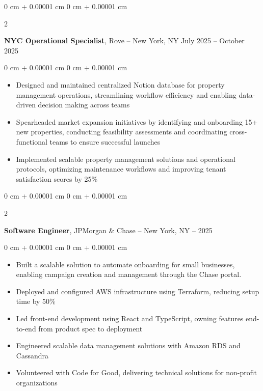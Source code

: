 \documentclass[10pt, letterpaper]{article}
\newenvironment{highlights}{
    \begin{itemize}[
        topsep=0.10 cm,
        parsep=0.10 cm,
        partopsep=0pt,
        itemsep=0pt,
        leftmargin=0 cm + 10pt
    ]
}{
    \end{itemize}
} %
\newenvironment{onecolentry}{
    \begin{adjustwidth}{
        0 cm + 0.00001 cm
    }{
        0 cm + 0.00001 cm
    }
}{
    \end{adjustwidth}
} %
\newenvironment{twocolentry}[2][]{
    \onecolentry
    \def\secondColumn{#2}
    \setcolumnwidth{\fill, 4.5 cm}
    \begin{paracol}{2}
}{
    \switchcolumn \raggedleft \secondColumn
    \end{paracol}
    \endonecolentry
} %
\begin{document}
    \vspace{0.4 cm}

        \begin{twocolentry}{
            July 2025 -- October 2025
        }
            \textbf{NYC Operational Specialist}, Rove -- New York, NY\end{twocolentry}

        \vspace{0.10 cm}
        \begin{onecolentry}
            \begin{highlights}
                \item Designed and maintained centralized Notion database for property management operations, streamlining workflow efficiency and enabling data-driven decision making across teams
                \item Spearheaded market expansion initiatives by identifying and onboarding 15+ new properties, conducting feasibility assessments and coordinating cross-functional teams to ensure successful launches
                \item Implemented scalable property management solutions and operational protocols, optimizing maintenance workflows and improving tenant satisfaction scores by 25\%
            \end{highlights}
        \end{onecolentry}

        \vspace{0.4 cm}

        \begin{twocolentry}{
            2022 -- 2025
        }
            \textbf{Software Engineer}, JPMorgan \& Chase -- New York, NY\end{twocolentry}

        \vspace{0.10 cm}
        \begin{onecolentry}
            \begin{highlights}
                \item Built a scalable solution to automate onboarding for small businesses, enabling campaign creation and management through the Chase portal.
                \item Deployed and configured AWS infrastructure using Terraform, reducing setup time by 50\%
                \item Led front-end development using React and TypeScript, owning features end-to-end from product spec to deployment
                \item Engineered scalable data management solutions with Amazon RDS and Cassandra
                \item Volunteered with Code for Good, delivering technical solutions for non-profit organizations
            \end{highlights}
        \end{onecolentry}
\end{document}
